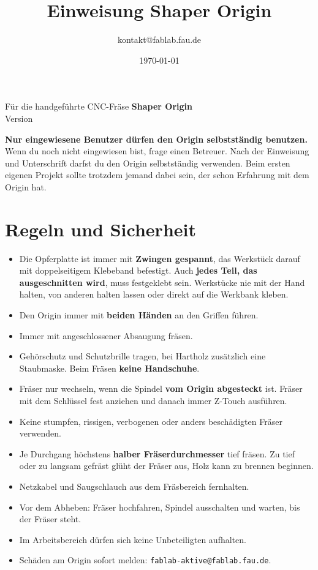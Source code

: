 \documentclass{\basedir/fablab-document}
\date{\today}
\author{kontakt@fablab.fau.de}
\title{Einweisung Shaper Origin}
\begin{document}
	\maketitle
	\begin{center}
		Für die handgeführte CNC-Fräse \textbf{Shaper Origin}\\[1mm]
		{\small Version \Version}
	\end{center}

	\textbf{Nur eingewiesene Benutzer dürfen den Origin selbstständig benutzen.}
	Wenn du noch nicht eingewiesen bist, frage einen Betreuer. Nach der Einweisung und Unterschrift darfst du den Origin selbstständig verwenden. Beim ersten eigenen Projekt sollte trotzdem jemand dabei sein, der schon Erfahrung mit dem Origin hat.

	\section{Regeln und Sicherheit}

	\begin{itemize}
		\item Die Opferplatte ist immer mit \textbf{Zwingen gespannt}, das Werkstück darauf mit doppelseitigem Klebeband befestigt. Auch \textbf{jedes Teil, das ausgeschnitten wird}, muss festgeklebt sein. Werkstücke nie mit der Hand halten, von anderen halten lassen oder direkt auf die Werkbank kleben.
		\item Den Origin immer mit \textbf{beiden Händen} an den Griffen führen.
		\item Immer mit angeschlossener Absaugung fräsen.
		\item Gehörschutz und Schutzbrille tragen, bei Hartholz zusätzlich eine Staubmaske. Beim Fräsen \textbf{keine Handschuhe}.
		\item Fräser nur wechseln, wenn die Spindel \textbf{vom Origin abgesteckt} ist. Fräser mit dem Schlüssel fest anziehen und danach immer Z-Touch ausführen.
		\item Keine stumpfen, rissigen, verbogenen oder anders beschädigten Fräser verwenden.
		\item Je Durchgang höchstens \textbf{halber Fräserdurchmesser} tief fräsen. Zu tief oder zu langsam gefräst glüht der Fräser aus, Holz kann zu brennen beginnen.
		\item Netzkabel und Saugschlauch aus dem Fräsbereich fernhalten.
		\item Vor dem Abheben: Fräser hochfahren, Spindel ausschalten und warten, bis der Fräser steht.
		\item Im Arbeitsbereich dürfen sich keine Unbeteiligten aufhalten.
		\item Schäden am Origin sofort melden: \texttt{fablab-aktive@fablab.fau.de}.
	\end{itemize}
\end{document}
